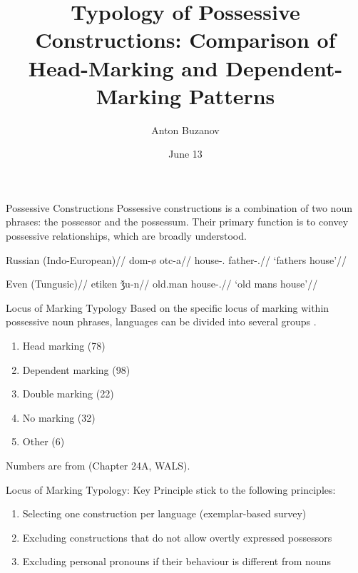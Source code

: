 \documentclass[12pt,aspectratio=169,t]{beamer}
\title{\textbf{Typology of Possessive Constructions: Comparison of Head-Marking and Dependent-Marking Patterns}}
\author{Anton Buzanov}
\institute{MA Thesis. Linguistic Theory and Language Description}
\date{June 13}
\renewcommand{\'}{\textquotesingle}
\begin{document}
\begin{frame}[plain]
\maketitle
\end{frame}


\begin{frame}{Possessive Constructions}
    Possessive constructions is a combination of two noun phrases: the possessor and the possessum. Their primary function is to convey possessive relationships, which are broadly understood.
    
    \begin{multicols}{2}
    	\ex
    	\begingl
    	\glpreamble Russian (Indo-European)//
    	\gla dom-\o{} otc-a//
    	\glb house-\Nom.\Sg{} father-\Gen.\Sg{}//
    	\glft `father\'s house'//
    	\endgl 
    	\xe
    	
    	\ex
    	\begingl
    	\glpreamble Even (Tungusic)//
    	\gla etiken  ǯu-n//
    	\glb old.man house-\Poss.\Tsg{}//
    	\glft `old man\'s house'//
    	\endgl 
    	\xe
    \end{multicols}
    
\end{frame}


\begin{frame}{Locus of Marking Typology}
	Based on the specific locus of marking within possessive noun phrases, languages can be divided into several groups \citep{nichols_locus_2013,van2016locus,van2016grammaticalization}.
	
	\begin{enumerate}
		\item Head marking (78)
		\item Dependent marking (98)
		\item Double marking (22)
		\item No marking (32)
		\item Other (6)
	\end{enumerate}
	
	\hfill \small Numbers are from \cite{nichols_locus_2013} (Chapter 24A, WALS).
\end{frame}

\begin{frame}{Locus of Marking Typology: Key Principle}
	\cite{nichols_locus_2013} stick to the following principles:
	
	\begin{enumerate}
		\item Selecting one construction per language (exemplar-based survey)
		\item Excluding constructions that do not allow overtly expressed possessors
		\item Excluding personal pronouns if their behaviour is different from nouns
	\end{enumerate}
\end{frame}
\end{document}
